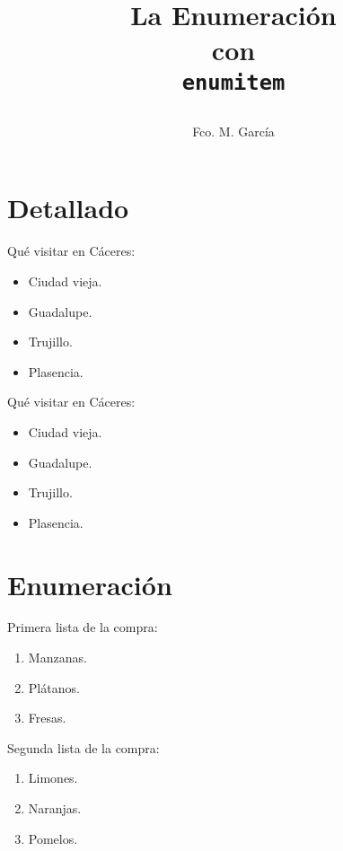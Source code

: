 \documentclass[a4paper,openright, spanish,12pt]{article}
\title
{
\HRule
\begin{flushright}
\Huge
\textbf{La Enumeración}\\[3mm]
\Large
\textbf{con}\\
\Huge
\texttt{enumitem}
\end{flushright}
\HRule 
}
\author{\large Fco. M. García}
\begin{document}
\maketitle
\tableofcontents %

\section{Detallado}

Qué visitar en Cáceres:
\begin{itemize}
  \item Ciudad vieja.
  \item Guadalupe.
  \item Trujillo.
  \item Plasencia.
\end{itemize}

Qué visitar en Cáceres:
\begin{itemize}[leftmargin=20mm]
  \item Ciudad vieja.
  \item Guadalupe.
  \item Trujillo.
  \item Plasencia.
\end{itemize}

\section{Enumeración}

  Primera lista de la compra:
  \begin{enumerate}
  \item Manzanas.
  \item Plátanos.
  \item Fresas.
  \end{enumerate}
  Segunda lista de la compra:
  \begin{enumerate}[resume]
  \item Limones.
  \item Naranjas.
  \item Pomelos.
  \end{enumerate}  
\end{document}
